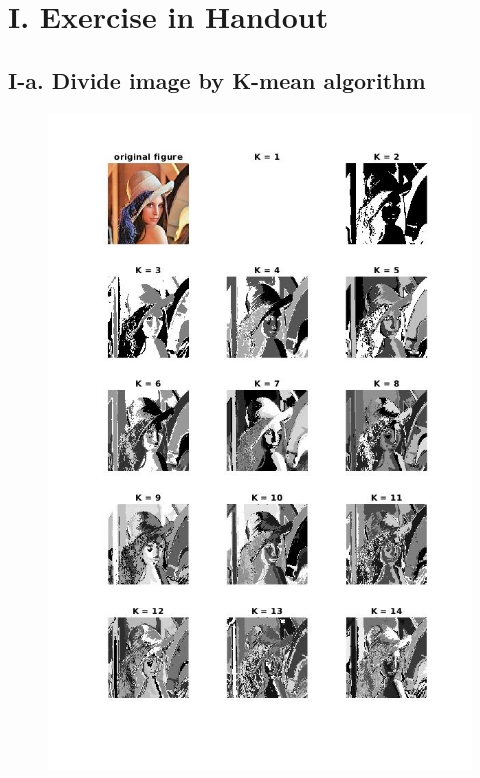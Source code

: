 \documentclass[twoside,a4paper]{article}
\begin{document}
\pagestyle{fancy}
\fancyhead{}


\section*{I. Exercise in Handout}

\subsection*{I-a. Divide image by K-mean algorithm} 
\begin{figure}[H]
\centering
\includegraphics[width=5.5in]{kmeanlena1.jpg}
\end{figure}
\end{document}
